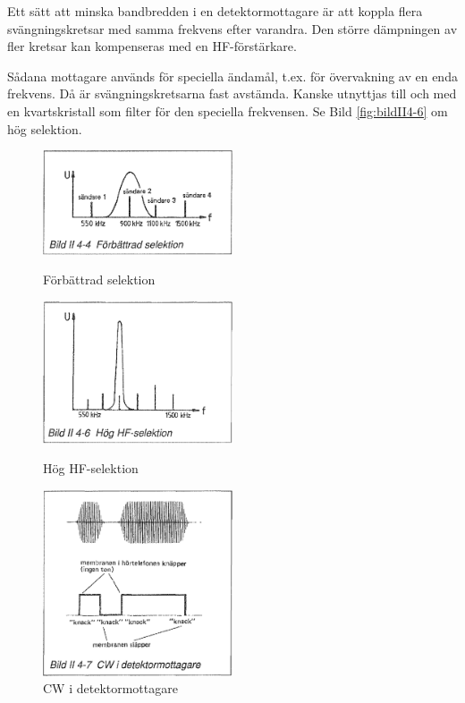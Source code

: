 Ett sätt att minska bandbredden i en detektormottagare är att koppla
flera svängningskretsar med samma frekvens efter varandra. Den större
dämpningen av fler kretsar kan kompenseras med en HF-förstärkare.

Sådana mottagare används för speciella ändamål, t.ex. för övervakning
av en enda frekvens. Då är svängningskretsarna fast avstämda. Kanske
utnyttjas till och med en kvartskristall som filter för den speciella
frekvensen. Se Bild \ref{fig:bildII4-6} om hög selektion.

\begin{figure}
  \includegraphics[width=0.5\textwidth]{images/bild_2_4-04}
  \caption{Förbättrad selektion}
  \label{fig:bildII4-4}

  \includegraphics[width=0.5\textwidth]{images/bild_2_4-06}
  \caption{Hög HF-selektion}
  \label{fig:bildII4-6}

  \includegraphics[width=0.5\textwidth]{images/bild_2_4-07}
  \caption{CW i detektormottagare}
  \label{fig:bildII4-7}
\end{figure}

